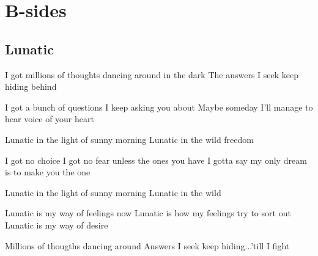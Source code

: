 \documentclass{article}
\newenvironment{album}[1]%
{%
  \section*{#1}
}%
{%
}
\newenvironment{song}[1]%
{%
  \subsection*{\textbf{#1}}
  \begin{multicols*}{2}
}%
{%
  \end{multicols*}
  \newpage
}
\newenvironment{couplet} %
{%
  \verbatim
}%
{% end code
  \endverbatim
}
\newenvironment{refrain} %
{%
  \verbatim
}%
{% end code
  \endverbatim
}
\newenvironment{pont} %
{%
  \verbatim
}%
{% end code
  \endverbatim
}
\begin{document}
\begin{album}{B-sides}
\begin{song}{Lunatic}
\begin{couplet}
I got millions of thoughts dancing around in the dark
The answers I seek keep hiding behind 
\end{couplet}
\begin{couplet}
I got  a bunch of questions I keep asking you about
Maybe someday I'll manage to hear voice of your heart
\end{couplet}
\begin{refrain}
Lunatic in the light
of sunny morning
Lunatic in the wild freedom
\end{refrain}
\begin{couplet}
I got no choice I got no fear unless the ones you have
I gotta say my only dream is to make you the one
\end{couplet}
\begin{refrain}
Lunatic in the light
of sunny morning
Lunatic in the wild 
\end{refrain}
\begin{pont}
Lunatic is my way of feelings now
Lunatic is how my feelings try to sort out
Lunatic is my way of desire
\end{pont}
\begin{couplet}
Millions of thougths dancing around
Answers I seek keep hiding...'till I fight 
\end{couplet}
\end{song}

\end{album}
\end{document}
